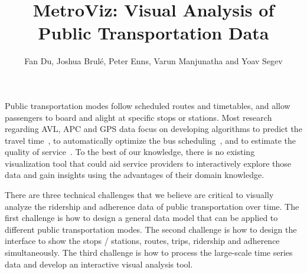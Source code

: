 \documentclass[journal]{vgtc}                %
\title{MetroViz: Visual Analysis of Public Transportation Data}
\author{Fan Du, Joshua Brulé, Peter Enns, Varun Manjunatha and Yoav Segev}
\begin{document}


\maketitle


Public transportation modes follow scheduled routes and timetables, and allow passengers to board and alight at specific stops or stations. Most research regarding AVL, APC and GPS data focus on developing algorithms to predict the travel time~\cite{Lee:2012:HNF:2424321.2424357,Tiesyte2008,Predic2007}, to automatically optimize the bus scheduling~\cite{4658140,Yu2007}, and to estimate the quality of service~\cite{camus2005estimation,hammerle2005use}. To the best of our knowledge, there is no existing visualization tool that could aid service providers to interactively explore those data and gain insights using the advantages of their domain knowledge.

There are three technical challenges that we believe are critical to visually analyze the ridership and adherence data of public transportation over time. The first challenge is how to design a general data model that can be applied to different public transportation modes. The second challenge is how to design the interface to show the stops / stations, routes, trips, ridership and adherence simultaneously. The third challenge is how to process the large-scale time series data and develop an interactive visual analysis tool.
\end{document}
